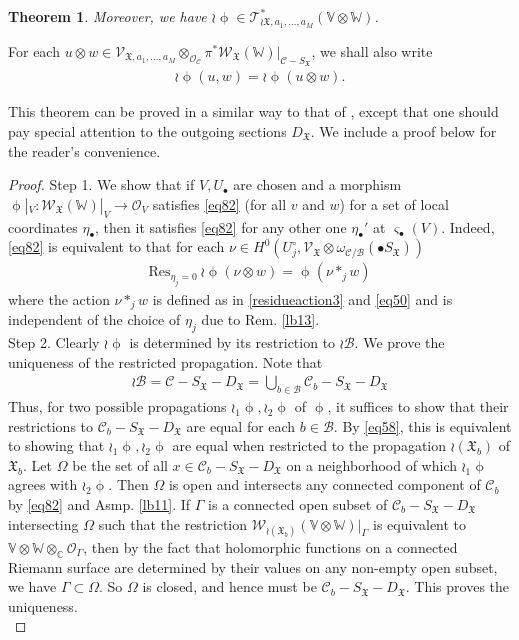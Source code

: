 \documentclass[11pt,b5paper,notitlepage]{article}
\theoremstyle{definition}
\theoremstyle{plain}
\newtheorem{thm}[df]{Theorem}
\newcommand{\fk}{\mathfrak}
\newcommand{\mc}{\mathcal}
\newcommand{\Res}{\mathrm{Res}}
\newcommand{\scr}{\mathscr}
\newcommand{\sgm}{\varsigma}
\newcommand{\SX}{{S_{\fk X}}}
\newcommand{\DX}{D_{\fk X}}
\newcommand{\blt}{\bullet}
\newcommand{\Vbb}{\mathbb V}
\newcommand{\Wbb}{\mathbb W}
\newcommand{\Cbb}{\mathbb C}
\newcommand{\<}{\left\langle}
\renewcommand{\>}{\right\rangle}
\numberwithin{equation}{section}
\begin{document}
\begin{thm}
Moreover, we have $\wr\upphi\in\scr T_{\wr{\fk X},a_1,\dots,a_M}^*(\Vbb\otimes\Wbb)$.
\end{thm}

For each $u\otimes w\in \scr V_{\fk X,a_1,\dots,a_M}\otimes_{\mc O_{\mc C}}\pi^*\scr W_{\fk X}(\Wbb)\big|_{\mc C-\SX}$, we shall also write
\begin{align}
\wr\upphi(u,w)=\wr\upphi(u\otimes w).  \label{eq64}
\end{align}

This theorem can be proved in a similar way to that of \cite[Thm. 7.1]{Gui-propagation}, except that one should pay special attention to the outgoing sections $\DX$.  We include a proof below for the reader's convenience.  %

\begin{proof}
Step 1. We show that if $V,U_\blt$ are chosen and a morphism $\upphi|_V:\scr W_{\fk X}(\Wbb)|_V\rightarrow \mc O_V$ satisfies \eqref{eq82} (for all $v$ and $w$) for a set of local coordinates $\eta_\blt$, then it satisfies \eqref{eq82} for any other one $\eta_\blt'$ at $\sgm_\blt(V)$. Indeed,  \eqref{eq82} is equivalent to that for each $\nu\in H^0(U_j^\circ,\scr  V_{\fk X}\otimes\omega_{\mc C/\mc B}(\blt\SX))$
\begin{align}
\Res_{\eta_j=0}~\wr\upphi(\nu\otimes w)=\upphi(\nu*_j w)
\end{align}
where the action $\nu*_j w$ is defined as in \eqref{residueaction3} and \eqref{eq50} and is independent of the choice of $\eta_j$ due to Rem. \ref{lb13}.\\

Step 2.  Clearly $\wr\upphi$ is determined by its restriction to $\wr\mc B$. We prove the uniqueness of the restricted propagation.  Note that
\begin{align}
\wr\mc B=\mc C-\SX-\DX=\bigcup_{b\in\mc B}\mc C_b-\SX-\DX\label{eq59}
\end{align}
Thus, for two possible propagations $\wr_1\upphi,\wr_2\upphi$ of $\upphi$,  it suffices to show that their restrictions to $\mc C_b-\SX-\DX$ are equal for each $b\in\mc B$. By \eqref{eq58}, this is equivalent to showing that $\wr_1\upphi,\wr_2\upphi$ are equal when restricted to the propagation $\wr(\fk X_b)$ of $\fk X_b$. Let $\Omega$ be the set of all $x\in\mc C_b-\SX-\DX$ on a neighborhood of which $\wr_1\upphi$ agrees with $\wr_2\upphi$. Then $\Omega$ is open and intersects any connected component of $\mc C_b$ by \eqref{eq82} and Asmp. \ref{lb11}. If $\Gamma$ is a connected open subset of $\mc C_b-\SX-\DX$ intersecting $\Omega$ such that the restriction $\scr W_{\wr(\fk X_b)}(\Vbb\otimes\Wbb)|_\Gamma$ is equivalent to $\Vbb\otimes\Wbb\otimes_\Cbb\mc O_\Gamma$, then by the fact that holomorphic functions on a connected Riemann surface are determined by their values on any non-empty open subset, we have $\Gamma\subset\Omega$. So $\Omega$ is closed, and hence must be $\mc C_b-\SX-\DX$. This proves the uniqueness.\\


\end{proof}
\end{document}
